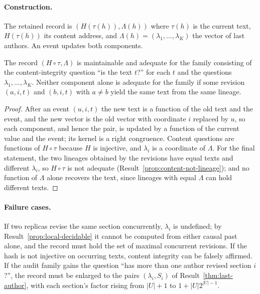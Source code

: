 \paragraph{Construction.} The retained record is $(H(\tau(h)),\Lambda(h))$ where $\tau(h)$ is the current text, $H(\tau(h))$ its content address, and $\Lambda(h)=(\lambda_1,\dots,\lambda_K)$ the vector of last authors. An event updates both components.

\begin{newresult}\label{prop:worked-doc}
The record $(H\circ\tau,\Lambda)$ is maintainable and adequate for the family consisting of the content-integrity question ``is the text $t$?'' for each $t$ and the questions $\lambda_1,\dots,\lambda_K$. Neither component alone is adequate for the family if some revision $(a,i,t)$ and $(b,i,t)$ with $a\ne b$ yield the same text from the same lineage.
\end{newresult}
\begin{proof}
After an event $(u,i,t)$ the new text is a function of the old text and the event, and the new vector is the old vector with coordinate $i$ replaced by $u$, so each component, and hence the pair, is updated by a function of the current value and the event; its kernel is a right congruence. Content questions are functions of $H\circ\tau$ because $H$ is injective, and $\lambda_i$ is a coordinate of $\Lambda$. For the final statement, the two lineages obtained by the revisions have equal texts and different $\lambda_i$, so $H\circ\tau$ is not adequate (Result~\ref{prop:content-not-lineage}); and no function of $\Lambda$ alone recovers the text, since lineages with equal $\Lambda$ can hold different texts.
\end{proof}

\paragraph{Failure cases.} If two replicas revise the same section concurrently, $\lambda_i$ is undefined; by Result~\ref{prop:local-decidable} it cannot be computed from either causal past alone, and the record must hold the set of maximal concurrent revisions. If the hash is not injective on occurring texts, content integrity can be falsely affirmed. If the audit family gains the question ``has more than one author revised section $i$?'', the record must be enlarged to the pairs $(\lambda_i,S_i)$ of Result~\ref{thm:last-author}, with each section's factor rising from $|U|+1$ to $1+|U|2^{|U|-1}$.


